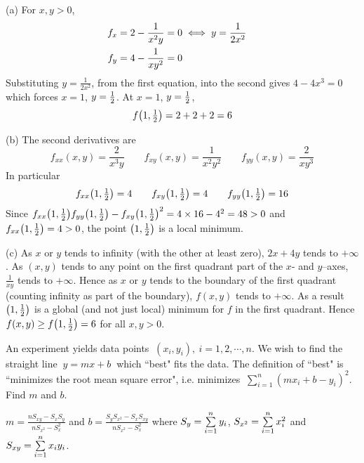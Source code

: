 \begin{solution}
(a) For $x,y>0$,
\begin{align*}
f_x&=2-\frac{1}{x^2y}=0\iff y=\frac{1}{2x^2}\cr
f_y&=4-\frac{1}{xy^2}=0
\end{align*}
Substituting $y=\frac{1}{2x^2}$, from the first equation, into the second gives
$
4-4x^3=0
$
which forces $x=1$, $y=\tfrac{1}{2}$. At $x=1$, $y=\tfrac{1}{2}$,
\begin{equation*}
f\big(1,\tfrac{1}{2}\big)=2+2+2=6
\end{equation*}

(b) The second derivatives are
\begin{equation*}
f_{xx}(x,y)=\frac{2}{x^3y}\qquad
f_{xy}(x,y)=\frac{1}{x^2y^2}\qquad
f_{yy}(x,y)=\frac{2}{xy^3}
\end{equation*}
In particular
\begin{equation*}
f_{xx}\big(1,\tfrac{1}{2}\big)=4\qquad
f_{xy}\big(1,\tfrac{1}{2}\big)=4\qquad
f_{yy}\big(1,\tfrac{1}{2}\big)=16
\end{equation*}
Since $f_{xx}\big(1,\tfrac{1}{2}\big)f_{yy}\big(1,\tfrac{1}{2}\big)-
                 f_{xy}\big(1,\tfrac{1}{2}\big)^2=4\times 16-4^2=48>0$ and $f_{xx}\big(1,\tfrac{1}{2}\big)=4>0$,
the point $\big(1,\tfrac{1}{2}\big)$ is a local minimum.

(c) As $x$ or $y$ tends to infinity (with the other at least zero), 
$2x+4y$ tends to $+\infty$. As $(x,y)$ tends to any point on the first quadrant part of the $x$- and $y$--axes, $\frac{1}{xy}$ tends to $+\infty$.  
Hence as $x$ or $y$ tends to the boundary of the first quadrant 
(counting infinity as part of the boundary), $f(x,y)$ tends to $+\infty$. 
As a result $\big(1,\tfrac{1}{2}\big)$ is a global (and not just local) minimum 
for $f$ in the first quadrant. Hence $f(x,y)\ge f\big(1,\tfrac{1}{2}\big)=6$ 
for all $x,y>0$. 
\end{solution}

\begin{question}
An experiment yields data points $\ (x_i,y_i),\ i=1,2,\cdots,n.$ We wish to find the straight line $\ y=mx+b\ $ which ``best" fits the data. The definition of ``best" is ``minimizes the root mean square error", i.e. minimizes
$\ \sum_{i=1}^n (mx_i+b-y_i)^2$. Find $m$ and $b$.
\end{question}


\begin{answer}
$m=\frac{nS_{xy}-S_xS_y}{nS_{x^2} -S_x^2}$ and
$b=\frac{S_yS_{x^2}-S_xS_{xy}}{nS_{x^2} -S_x^2}$ where
$S_y=\mathop{{\textstyle \sum}}\limits_{i=1}^n y_i$, $S_{x^2}=\mathop{{\textstyle \sum}}\limits_{i=1}^n x^2_i$ and
$S_{xy}=\mathop{{\textstyle \sum}}\limits_{i=1}^n x_iy_i$.
\end{answer}

